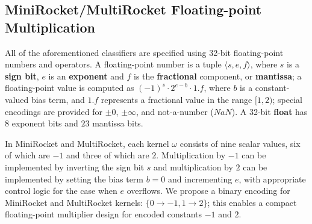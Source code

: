 
\subsection{MiniRocket/MultiRocket Floating-point Multiplication}
\label{sec:fp_mult}

All of the aforementioned classifiers are specified using 32-bit floating-point numbers and operators. 
A floating-point number is a tuple $\langle s, e, f \rangle$, where $s$ is a \textbf{sign bit}, $e$ is an \textbf{exponent} and $f$ is the \textbf{fractional} component, or \textbf{mantissa}; a floating-point value is computed as $(-1)^s\cdot2^{e-b}\cdot1.f$, where $b$ is a constant-valued bias term, and $1.f$ represents a fractional value in the range $[1, 2)$; special encodings are provided for $\pm 0$, $\pm \infty$, and not-a-number ($NaN$). A 32-bit \textbf{float} has $8$ exponent bits and $23$ mantissa bits. 

In MiniRocket and MultiRocket, each kernel $\omega$ consists of nine scalar values, six of which are $-1$ and three of which are $2$. 
Multiplication by $-1$ can be implemented by inverting the sign bit $s$ and multiplication by $2$ can be implemented by setting the bias term $b=0$ and incrementing $e$, with appropriate control logic for the case when $e$ overflows. %
We propose a binary encoding for MiniRocket and MultiRocket kernels: $\{0 \rightarrow -1, 1 \rightarrow 2\}$; this enables a compact floating-point multiplier design for encoded constants $-1$ and $2$. 

